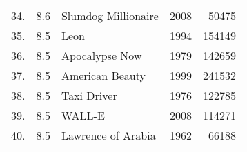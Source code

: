 {\begin{longtable}[c]{lrXrr}
34. & 8.6 & Slumdog Millionaire                                                  & 2008 & 50475  \\
35. & 8.5 & Leon                                                                 & 1994 & 154149 \\
36. & 8.5 & Apocalypse Now                                                       & 1979 & 142659 \\
37. & 8.5 & American Beauty                                                      & 1999 & 241532 \\
38. & 8.5 & Taxi Driver                                                          & 1976 & 122785 \\
39. & 8.5 & WALL-E                                                               & 2008 & 114271 \\
40. & 8.5 & Lawrence of Arabia                                                   & 1962 & 66188  \\
\bottomrule
\end{longtable}
}
